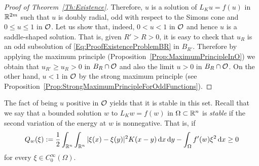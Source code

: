 \begin{proof}[Proof of Theorem~\ref{Th:Existence}]
	Therefore, $u$ is a solution of $L_K u = f(u)$ in $\mathbb{R}^{2m}$ such that $u$ is doubly radial, odd with respect to the Simons cone and $0\leq u \leq 1$ in $\mathcal{O}$. Let us show that, indeed, $0 < u < 1$ in $\mathcal{O}$ and hence $u$ is a saddle-shaped solution. That is, given $R'>R>0$, it is easy to check that $u_R$ is an odd subsolution of \eqref{Eq:ProofExistenceProblemBR} in $B_{R'}$. Therefore by applying the maximum principle (Proposition~\ref{Prop:MaximumPrincipleInO}) we obtain that $u_{R'}\geq u_R>0$ in $B_R\cap \mathcal{O}$ and also the limit $u>0$ in $B_R\cap \mathcal{O}$. On the other hand, $u < 1$ in $\mathcal{O}$ by the strong maximum principle (see Proposition~\ref{Prop:StrongMaximumPrincipleForOddFunctions}).
\end{proof}




The fact of being $u$ positive in $\mathcal{O}$ yields that it is stable in this set. Recall that we say that a bounded solution $w$ to $L_K w = f(w)$ in $\Omega\subset \mathbb{R}^n$ is \emph{stable} if the second variation of the energy at $w$ is nonnegative. That is, if
\begin{equation}
	\label{Eq:StablityCondition}	
	Q_w(\xi) := \dfrac{1}{2} \int_{\mathbb{R}^n} \int_{\mathbb{R}^n} |\xi (x) - \xi(y)|^2 K(x - y) \,\mathrm{d} x \,\mathrm{d} y - \int_{\Omega} f'(w) \xi^2 \,\mathrm{d} x \geq 0
\end{equation}
for every $\xi \in C^\infty_0 (\Omega)$.



